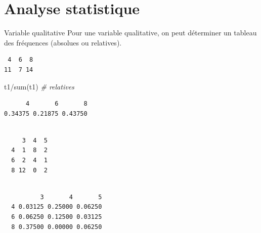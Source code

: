 \documentclass[
  8pt,
  ignorenonframetext,
]{beamer}
\newenvironment{Shaded}{\begin{snugshade}}{\end{snugshade}}
\newcommand{\AttributeTok}[1]{\textcolor[rgb]{0.77,0.63,0.00}{#1}}
\newcommand{\CommentTok}[1]{\textcolor[rgb]{0.56,0.35,0.01}{\textit{#1}}}
\newcommand{\FunctionTok}[1]{\textcolor[rgb]{0.00,0.00,0.00}{#1}}
\newcommand{\NormalTok}[1]{#1}
\newcommand{\SpecialCharTok}[1]{\textcolor[rgb]{0.00,0.00,0.00}{#1}}
\begin{document}
\hypertarget{analyse-statistique}{%
\section{Analyse statistique}\label{analyse-statistique}}

\begin{frame}[fragile]{Variable qualitative}
\protect\hypertarget{variable-qualitative-1}{}
Pour une variable qualitative, on peut déterminer un tableau des
fréquences (absolues ou relatives).

\begin{Shaded}
\end{Shaded}

\begin{verbatim}
 4  6  8 
11  7 14 
\end{verbatim}

\begin{Shaded}
\begin{Highlighting}[]
\NormalTok{t1}\SpecialCharTok{/}\FunctionTok{sum}\NormalTok{(t1)             }\CommentTok{\# relatives}
\end{Highlighting}
\end{Shaded}

\begin{verbatim}
      4       6       8 
0.34375 0.21875 0.43750 
\end{verbatim}

\begin{Shaded}
\end{Shaded}

\begin{verbatim}
   
     3  4  5
  4  1  8  2
  6  2  4  1
  8 12  0  2
\end{verbatim}

\begin{verbatim}
   
          3       4       5
  4 0.03125 0.25000 0.06250
  6 0.06250 0.12500 0.03125
  8 0.37500 0.00000 0.06250
\end{verbatim}
\end{frame}
\end{document}
